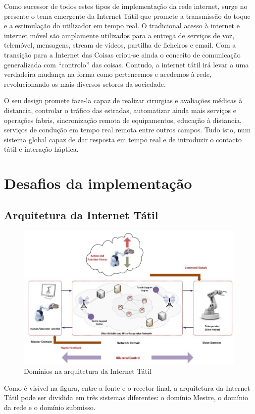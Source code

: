 \documentclass{llncs}
\begin{document}
Como sucessor de todos estes tipos de implementação da rede internet, surge no presente o tema emergente da Internet Tátil que promete a transmissão do toque e a estimulação do utilizador em tempo real. O tradicional acesso à internet e internet móvel são amplamente utilizados para a entrega de serviços de voz, telemóvel, mensagens, stream de vídeos, partilha de ficheiros e email. Com a transição para a Internet das Coisas criou-se ainda o conceito de comunicação generalizada com “controlo” das coisas. Contudo, a internet tátil irá levar a uma verdadeira mudança na forma como pertencemos e acedemos à rede, revolucionando os mais diversos setores da sociedade.

O seu design promete faze-la capaz de realizar cirurgias e avaliações médicas à distancia, controlar o tráfico das estradas, automatizar ainda mais serviços e operações fabris, sincronização remota de equipamentos, educação à distancia, serviços de condução em tempo real remota entre outros campos. Tudo isto, num sistema global capaz de dar resposta em tempo real e de introduzir o contacto tátil e interação háptica.


\section{Desafios da implementação}

\subsection{Arquitetura da Internet Tátil}

\begin{figure}[!h]
\centering
\includegraphics[scale=0.5]{imagem1.jpg}
\caption{Domínios na arquitetura da Internet Tátil ~\cite{Artigo1}}
\label{Rotulo}
\end{figure}
\setlength{\parindent}{0.5cm}
Como é visível na figura, entre a fonte e o recetor final, a arquitetura da Internet Tátil pode ser dividida em três sistemas diferentes: o domínio Mestre, o domínio da rede e o domínio submisso.
\end{document}
